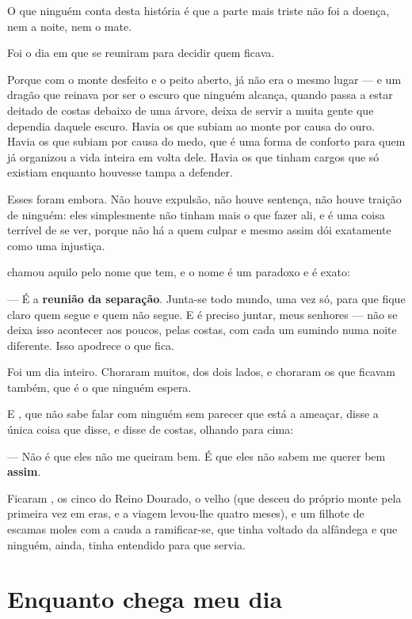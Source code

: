 \documentclass[livro.tex]{subfiles}
\begin{document}
O que ninguém conta desta história é que a parte mais triste não foi a doença, nem a noite, nem o
mate.

Foi o dia em que se reuniram para decidir quem ficava.

\medskip

Porque com o monte desfeito e o peito aberto, \Ven já não era o mesmo lugar --- e um dragão que
reinava por ser o escuro que ninguém alcança, quando passa a estar deitado de costas debaixo de
uma árvore, deixa de servir a muita gente que dependia daquele escuro. Havia os que subiam ao
monte por causa do ouro. Havia os que subiam por causa do medo, que é uma forma de conforto para
quem já organizou a vida inteira em volta dele. Havia os que tinham cargos que só existiam
enquanto houvesse tampa a defender.

Esses foram embora. Não houve expulsão, não houve sentença, não houve traição de ninguém: eles
simplesmente não tinham mais o que fazer ali, e é uma coisa terrível de se ver, porque não há a
quem culpar e mesmo assim dói exatamente como uma injustiça.

\medskip

\Qui chamou aquilo pelo nome que tem, e o nome é um paradoxo e é exato:

--- É a \textbf{reunião da separação}. Junta-se todo mundo, uma vez só, para que fique claro quem
segue e quem não segue. E é preciso juntar, meus senhores --- não se deixa isso acontecer aos
poucos, pelas costas, com cada um sumindo numa noite diferente. Isso apodrece o que fica.

Foi um dia inteiro. Choraram muitos, dos dois lados, e choraram os que ficavam também, que é o
que ninguém espera.

E \Ven , que não sabe falar com ninguém sem parecer que está a ameaçar, disse a única coisa que
disse, e disse de costas, olhando para cima:

--- Não é que eles não me queiram bem. É que eles não sabem me querer bem \textbf{assim}.

\medskip

Ficaram \Qui , os cinco do Reino Dourado, o velho \Odo (que desceu do próprio monte pela primeira
vez em eras, e a viagem levou-lhe quatro meses), e um filhote de escamas moles com a cauda a
ramificar-se, que tinha voltado da alfândega e que ninguém, ainda, tinha entendido para que
servia.

\section{Enquanto chega meu dia}
\end{document}
